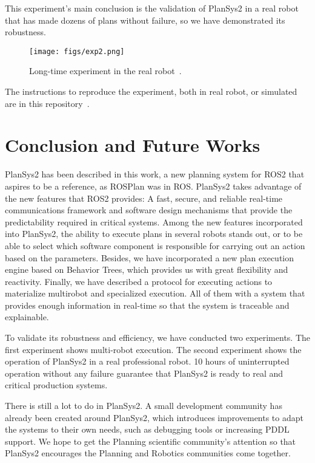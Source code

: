 \documentclass[letterpaper, 10 pt, conference]{IEEEtran}
\begin{document}
This experiment's main conclusion is the validation of PlanSys2 in a real robot that has made dozens of plans without failure, so we have demonstrated its robustness.

\begin{figure}[tb]
  \centering
  \texttt{[image: figs/exp2.png]}
  \caption{Long-time experiment in the real robot~\cite{exp_video}.}
  \label{fig:exp-long}
\end{figure}

The instructions to reproduce the experiment, both in real robot, or simulated are in this repository~\cite{exp_repo}.

\section{Conclusion and Future Works}
\label{sec:conclusions}

PlanSys2 has been described in this work, a new planning system for ROS2 that aspires to be a reference, as ROSPlan was in ROS. PlanSys2 takes advantage of the new features that ROS2 provides: A fast, secure, and reliable real-time communications framework and software design mechanisms that provide the predictability required in critical systems. Among the new features incorporated into PlanSys2, the ability to execute plans in several robots stands out, or to be able to select which software component is responsible for carrying out an action based on the parameters. Besides, we have incorporated a new plan execution engine based on Behavior Trees, which provides us with great flexibility and reactivity. Finally, we have described a protocol for executing actions to materialize multirobot and specialized execution. All of them with a system that provides enough information in real-time so that the system is traceable and explainable.

To validate its robustness and efficiency, we have conducted two experiments. The first experiment shows multi-robot execution. The second experiment shows the operation of PlanSys2 in a real professional robot. 10 hours of uninterrupted operation without any failure guarantee that PlanSys2 is ready to real and critical production systems.

There is still a lot to do in PlanSys2. A small development community has already been created around PlanSys2, which introduces improvements to adapt the systems to their own needs, such as debugging tools or increasing PDDL support. We hope to get the Planning scientific community's attention so that PlanSys2 encourages the Planning and Robotics communities come together.
\end{document}
